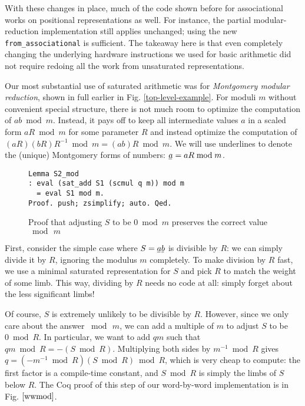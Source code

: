 \documentclass[conference,letterpaper]{IEEEtran}
\newcommand{\bunderline}[1]{\underline{#1\mkern-2mu}\mkern2mu }
\begin{document}
With these changes in place, much of the code shown before for associational works on positional representations as well.
For instance, the partial modular-reduction implementation still applies unchanged; using the new \texttt{from\_associational} is sufficient.
The takeaway here is that even completely changing the underlying hardware instructions we used for basic arithmetic did not require redoing all the work from unsaturated representations.

Our most substantial use of saturated arithmetic was for \emph{Montgomery modular reduction}, shown in full earlier in Fig. \ref{top-level-example}.
For moduli $m$ without convenient special structure, there is not much room to optimize the computation of $ab \bmod m$.
Instead, it pays off to keep all intermediate values $a$ in a scaled form $aR \bmod m$ for some parameter $R$ and instead optimize the computation of $(aR)(bR)R^{-1} \bmod m = (ab)R \bmod m$.
We will use underlines to denote the (unique) Montgomery forms of numbers: $\bunderline{a} = aR \bmod m$.

\begin{figure}
\begin{verbatim}
Lemma S2_mod
: eval (sat_add S1 (scmul q m)) mod m
  = eval S1 mod m.
Proof. push; zsimplify; auto. Qed.
\end{verbatim}
  \caption{\label{wwmod}Proof that adjusting $S$ to be $0 \bmod m$ preserves the correct value $\bmod\, m$}
\end{figure}

First, consider the simple case where $S = \bunderline{a}\bunderline{b}$ is divisible by $R$: we can simply divide it by $R$, ignoring the modulus $m$ completely.
To make division by $R$ fast, we use a minimal saturated representation for $S$ and pick $R$ to match the weight of some limb.
This way, dividing by $R$ needs no code at all: simply forget about the less significant limbs!

Of course, $S$ is extremely unlikely to be divisible by $R$.
However, since we only care about the answer $\bmod\, m$, we can add a multiple of $m$ to adjust $S$ to be $0 \bmod R$.
In particular, we want to add $qm$ such that $qm \bmod R = -(S \bmod R)$.
Multiplying both sides by $m^{-1} \bmod R$ gives $q = (-m^{-1} \bmod R)(S \bmod R) \bmod R$, which is very cheap to compute: the first factor is a compile-time constant, and $S \bmod R$ is simply the limbs of $S$ below $R$.
The Coq proof of this step of our word-by-word implementation is in Fig. $\ref{wwmod}$.
\end{document}
